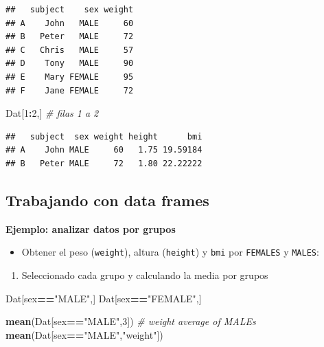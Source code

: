 \documentclass[]{book}
\newenvironment{Shaded}{\begin{snugshade}}{\end{snugshade}}
\newcommand{\KeywordTok}[1]{\textcolor[rgb]{0.13,0.29,0.53}{\textbf{#1}}}
\newcommand{\DecValTok}[1]{\textcolor[rgb]{0.00,0.00,0.81}{#1}}
\newcommand{\StringTok}[1]{\textcolor[rgb]{0.31,0.60,0.02}{#1}}
\newcommand{\CommentTok}[1]{\textcolor[rgb]{0.56,0.35,0.01}{\textit{#1}}}
\newcommand{\OperatorTok}[1]{\textcolor[rgb]{0.81,0.36,0.00}{\textbf{#1}}}
\newcommand{\NormalTok}[1]{#1}
\providecommand{\tightlist}{%
  \setlength{\itemsep}{0pt}\setlength{\parskip}{0pt}}
\begin{document}
\begin{verbatim}
##   subject    sex weight
## A    John   MALE     60
## B   Peter   MALE     72
## C   Chris   MALE     57
## D    Tony   MALE     90
## E    Mary FEMALE     95
## F    Jane FEMALE     72
\end{verbatim}

\begin{Shaded}
\begin{Highlighting}[]
\NormalTok{Dat[}\DecValTok{1}\OperatorTok{:}\DecValTok{2}\NormalTok{,]   }\CommentTok{# filas 1 a 2}
\end{Highlighting}
\end{Shaded}

\begin{verbatim}
##   subject  sex weight height      bmi
## A    John MALE     60   1.75 19.59184
## B   Peter MALE     72   1.80 22.22222
\end{verbatim}

\subsection{Trabajando con data
frames}\label{trabajando-con-data-frames}

\textbf{Ejemplo: analizar datos por grupos}

\begin{itemize}
\tightlist
\item
  Obtener el peso (\texttt{weight}), altura (\texttt{height}) y
  \texttt{bmi} por \texttt{FEMALES} y \texttt{MALES}:
\end{itemize}

\begin{enumerate}
\def\labelenumi{\arabic{enumi}.}
\tightlist
\item
  Seleccionado cada grupo y calculando la media por grupos
\end{enumerate}

\begin{Shaded}
\begin{Highlighting}[]
\NormalTok{Dat[sex}\OperatorTok{==}\StringTok{"MALE"}\NormalTok{,]}
\NormalTok{Dat[sex}\OperatorTok{==}\StringTok{"FEMALE"}\NormalTok{,]}

\KeywordTok{mean}\NormalTok{(Dat[sex}\OperatorTok{==}\StringTok{"MALE"}\NormalTok{,}\DecValTok{3}\NormalTok{])  }\CommentTok{# weight average of MALEs}
\KeywordTok{mean}\NormalTok{(Dat[sex}\OperatorTok{==}\StringTok{"MALE"}\NormalTok{,}\StringTok{"weight"}\NormalTok{])}
\end{Highlighting}
\end{Shaded}
\end{document}
